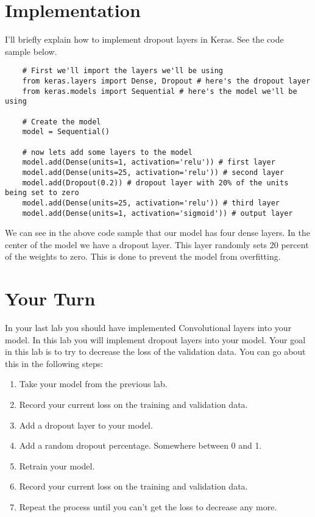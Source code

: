 \documentclass[11pt]{report}
\begin{document}
\clearpage

\chapter{Implementation}
I'll briefly explain how to implement dropout layers in Keras. See the code sample below.

\begin{verbatim}
    # First we'll import the layers we'll be using
    from keras.layers import Dense, Dropout # here's the dropout layer
    from keras.models import Sequential # here's the model we'll be using

    # Create the model
    model = Sequential()

    # now lets add some layers to the model
    model.add(Dense(units=1, activation='relu')) # first layer
    model.add(Dense(units=25, activation='relu')) # second layer
    model.add(Dropout(0.2)) # dropout layer with 20% of the units being set to zero
    model.add(Dense(units=25, activation='relu')) # third layer
    model.add(Dense(units=1, activation='sigmoid')) # output layer
\end{verbatim}
We can see in the above code sample that our model has four dense layers. In the center of the model we have a dropout layer. This layer randomly sets 20 percent of the weights to zero. This is done to prevent the model from overfitting. 


\chapter{Your Turn}
In your last lab you should  have implemented Convolutional layers into your model. In this lab you will implement dropout layers into your model. Your goal in this lab is to try to decrease the loss of the validation data. You can go about this in the following steps:
\pagebreak
\begin{enumerate}
    \item{Take your model from the previous lab.}
    \item{Record your current loss on the training and validation data.}
    \item{Add a dropout layer to your model.}
    \item{Add a random dropout percentage. Somewhere between 0 and 1.}
    \item{Retrain your model.}
    \item{Record your current loss on the training and validation data.}
    \item{Repeat the process until you can't get the loss to decrease any more.}
\end{enumerate}
\end{document}
